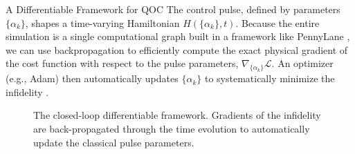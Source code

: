 \documentclass[final]{beamer}
\newlength{\colwidth}
\begin{document}
\begin{frame}[t]
\begin{columns}[t]
\begin{column}{\colwidth}
\begin{alertblock}{A Differentiable Framework for QOC}
    The control pulse, defined by parameters $\{\alpha_{k}\}$, shapes a time-varying Hamiltonian $H(\{\alpha_{k}\}, t)$. Because the entire simulation is a single computational graph built in a framework like PennyLane \cite{Bergholm2018}, we can use backpropagation to efficiently compute the exact physical gradient of the cost function with respect to the pulse parameters, $\nabla_{\{\alpha_{k}\}}\mathcal{L}$. An optimizer (e.g., Adam) then automatically updates $\{\alpha_{k}\}$ to systematically minimize the infidelity \cite{Berni2025Proposal}.
    
    \begin{figure}
        \centering
        \caption{The closed-loop differentiable framework. Gradients of the infidelity are back-propagated through the time evolution to automatically update the classical pulse parameters.}
    \end{figure}    
  \end{alertblock}


\end{column}
\end{columns}
\end{frame}
\end{document}
